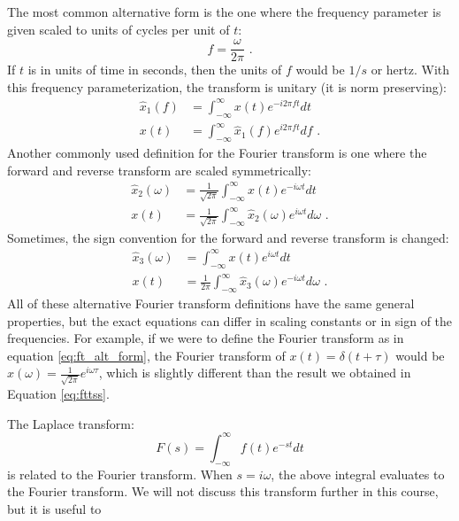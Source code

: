 The most common alternative form is the one where the frequency parameter is given scaled to units of cycles per unit of $t$:
\begin{equation}
f = \frac{\omega}{2\pi}\,\,.
\end{equation}
If $t$ is in units of time in seconds, then the units of $f$ would be $1/s$ or hertz. With this frequency parameterization, the transform is unitary (it is norm preserving):
\begin{align}
\hat{x}_1(f) &=  \int_{-\infty}^{\infty} x(t) e^{-i 2\pi f  t}d t\\
x(t) &= \int_{-\infty}^{\infty} \hat{x}_1(f) e^{i 2\pi f t} d f\,\,.
\end{align}
Another commonly used definition for the Fourier transform is one where the forward and reverse transform are scaled symmetrically:
\begin{align}
\hat{x}_2(\omega) &= \frac{1}{\sqrt{2\pi}} \int_{-\infty}^{\infty} x(t) e^{-i\omega t}dt \label{eq:ft_alt_form}\\
x(t) &= \frac{1}{\sqrt{2\pi}} \int_{-\infty}^{\infty} \hat{x}_2(\omega) e^{i\omega t}d\omega\,\,.
\end{align}
Sometimes, the sign convention for the forward and reverse transform is changed:
\begin{align}
\hat{x}_3(\omega) &=  \int_{-\infty}^{\infty} x(t) e^{i\omega t}dt\\
x(t) &= \frac{1}{2\pi} \int_{-\infty}^{\infty} \hat{x}_3(\omega) e^{-i\omega t}d\omega\,\,.
\end{align}
All of these alternative Fourier transform definitions have the same general properties, but the exact equations can differ in scaling constants or in sign of the frequencies. For example, if we were to define the Fourier transform as in equation \ref{eq:ft_alt_form}, the Fourier transform of $x(t)=\delta(t+\tau)$ would be $\hat{x}(\omega)=\frac{1}{\sqrt{2\pi}}e^{i\omega \tau}$, which is slightly different than the result we obtained in Equation \ref{eq:fttss}.

The Laplace transform:
\begin{equation}
  F(s) = \int_{-\infty}^{\infty} f(t) e^{-st} dt
\end{equation}
is related to the Fourier transform. When $s=i\omega$, the above integral evaluates to the Fourier transform. We will not discuss this transform further in this course, but it is useful to 
\fi
